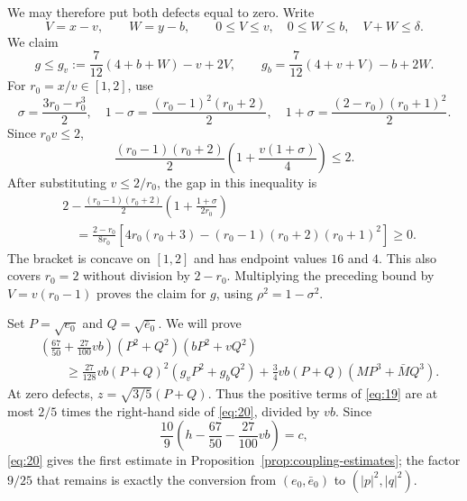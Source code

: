 We may therefore put both defects equal to zero. Write
\[
 V=x-v,\qquad W=y-b,\qquad
 0\le V\le v,\quad0\le W\le b,\quad V+W\le\delta.
\]
We claim
\[
 g\le g_v:=\frac7{12}(4+b+W)-v+2V,
 \qquad
 g_b=\frac7{12}(4+v+V)-b+2W.
\]
For $r_0=x/v\in[1,2]$, use
\[
 \sigma=\frac{3r_0-r_0^3}{2},\quad
 1-\sigma=\frac{(r_0-1)^2(r_0+2)}2,\quad
 1+\sigma=\frac{(2-r_0)(r_0+1)^2}{2}.
\]
Since $r_0v\le2$,
\[
 \frac{(r_0-1)(r_0+2)}2
       \left(1+\frac{v(1+\sigma)}4\right)\le2.
\]
After substituting $v\le2/r_0$, the gap in this inequality is
\[
 \begin{aligned}
 &2-\frac{(r_0-1)(r_0+2)}2
       \left(1+\frac{1+\sigma}{2r_0}\right)\\
 &\quad=\frac{2-r_0}{8r_0}
 \left[4r_0(r_0+3)-(r_0-1)(r_0+2)(r_0+1)^2\right]\ge0.
 \end{aligned}
\]
The bracket is concave on $[1,2]$ and has endpoint values $16$ and $4$.
This also covers $r_0=2$ without division by $2-r_0$. Multiplying the preceding bound
by $V=v(r_0-1)$ proves the claim for $g$, using
$\rho^2=1-\sigma^2$.

Set $P=\sqrt{e_0}$ and $Q=\sqrt{\bar e_0}$. We will prove
\begin{equation}
\begin{aligned}
 &\left(\frac{67}{50}+\frac{27}{100}vb\right)
       (P^2+Q^2)(bP^2+vQ^2)\\
 &\qquad\ge
       \frac{27}{128}vb(P+Q)^2(g_vP^2+g_bQ^2)
       +\frac34vb(P+Q)(MP^3+\bar M Q^3).
\end{aligned}
\tag{20}\label{eq:20}
\end{equation}
At zero defects, $z=\sqrt{3/5}(P+Q)$. Thus the positive terms of
\eqref{eq:19} are at most $2/5$ times the right-hand side of
\eqref{eq:20}, divided by $vb$. Since
\[
 \frac{10}{9}\left(h-\frac{67}{50}-\frac{27}{100}vb\right)=c,
\]
\eqref{eq:20} gives the first estimate in
Proposition~\ref{prop:coupling-estimates}; the factor $9/25$ that remains
is exactly the conversion from $(e_0,\bar e_0)$ to $(|p|^2,|q|^2)$.


